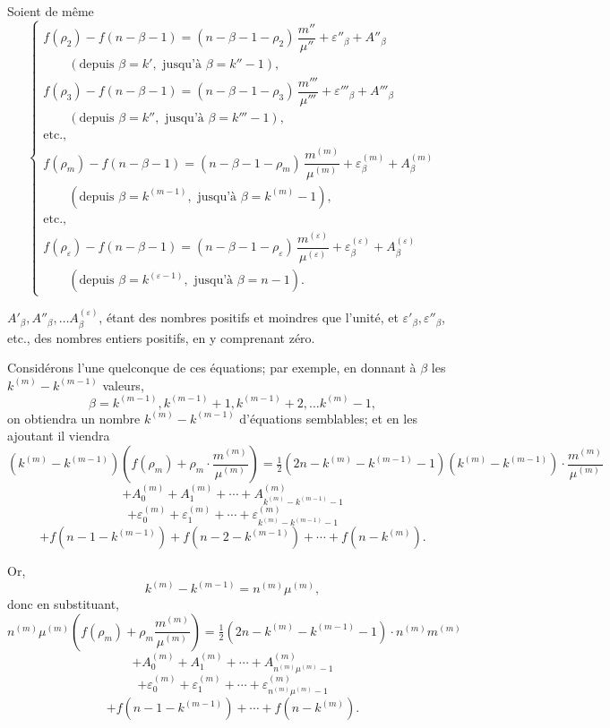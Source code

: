 \documentclass{article}
\begin{document}
Soient de même
\[ \begin{cases}
f(\rho_2) - f(n-\beta-1) = (n-\beta-1-\rho_2)\,\dfrac{m''}{\mu''} + \varepsilon''_\beta + A''_\beta \\
\qquad (\text{depuis } \beta = k', \text{ jusqu'à } \beta = k''-1), \\
f(\rho_3) - f(n-\beta-1) = (n-\beta-1-\rho_3)\,\dfrac{m'''}{\mu'''} + \varepsilon'''_\beta + A'''_\beta \\
\qquad (\text{depuis } \beta = k'', \text{ jusqu'à } \beta = k'''-1), \\
\text{etc.,} \\
f(\rho_m) - f(n-\beta-1) = (n-\beta-1-\rho_m)\,\dfrac{m^{(m)}}{\mu^{(m)}} + \varepsilon^{(m)}_\beta + A^{(m)}_\beta \\
\qquad (\text{depuis } \beta = k^{(m-1)}, \text{ jusqu'à } \beta = k^{(m)}-1), \\
\text{etc.,} \\
f(\rho_\varepsilon) - f(n-\beta-1) = (n-\beta-1-\rho_\varepsilon)\,\dfrac{m^{(\varepsilon)}}{\mu^{(\varepsilon)}} + \varepsilon^{(\varepsilon)}_\beta + A^{(\varepsilon)}_\beta \\
\qquad (\text{depuis } \beta = k^{(\varepsilon-1)}, \text{ jusqu'à } \beta = n-1).
\end{cases} \tag{84} \]

$A'_\beta, A''_\beta, \ldots A^{(\varepsilon)}_\beta$, étant des nombres positifs et moindres que l'unité, et $\varepsilon'_\beta, \varepsilon''_\beta$, etc., des nombres entiers positifs, en y comprenant zéro.

Considérons l'une quelconque de ces équations; par exemple, en donnant à $\beta$ les $k^{(m)}-k^{(m-1)}$ valeurs,
\[ \beta = k^{(m-1)}, k^{(m-1)}+1, k^{(m-1)}+2, \ldots k^{(m)}-1, \]
on obtiendra un nombre $k^{(m)} - k^{(m-1)}$ d'équations semblables; et en les ajoutant il viendra
\[ (k^{(m)}-k^{(m-1)})\left(f(\rho_m)+\rho_m \cdot \frac{m^{(m)}}{\mu^{(m)}}\right) = \tfrac{1}{2}(2n-k^{(m)}-k^{(m-1)}-1)(k^{(m)}-k^{(m-1)}) \cdot \frac{m^{(m)}}{\mu^{(m)}} \]
\[ + A_0^{(m)} + A_1^{(m)} + \cdots + A_{k^{(m)}-k^{(m-1)}-1}^{(m)} \]
\[ + \varepsilon_0^{(m)} + \varepsilon_1^{(m)} + \cdots + \varepsilon_{k^{(m)}-k^{(m-1)}-1}^{(m)} \]
\[ + f(n-1-k^{(m-1)}) + f(n-2-k^{(m-1)}) + \cdots + f(n-k^{(m)}). \]

Or,
\[ k^{(m)} - k^{(m-1)} = n^{(m)}\mu^{(m)}, \]
donc en substituant,
\[ n^{(m)}\mu^{(m)}\left(f(\rho_m)+\rho_m \frac{m^{(m)}}{\mu^{(m)}}\right) = \tfrac{1}{2}(2n-k^{(m)}-k^{(m-1)}-1) \cdot n^{(m)}m^{(m)} \]
\[ + A_0^{(m)}+A_1^{(m)}+\cdots+A_{n^{(m)}\mu^{(m)}-1}^{(m)} \]
\[ + \varepsilon_0^{(m)}+\varepsilon_1^{(m)}+\cdots+\varepsilon_{n^{(m)}\mu^{(m)}-1}^{(m)} \]
\[ + f(n-1-k^{(m-1)}) + \cdots + f(n-k^{(m)}). \]
\end{document}
